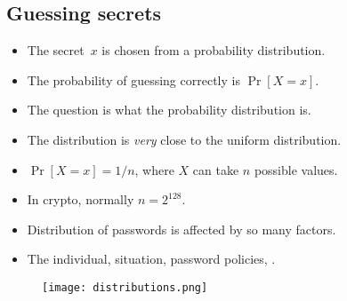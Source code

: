 \subsection{Guessing secrets}

\begin{frame}
  \begin{idea}
    \begin{itemize}
      \item The secret~\(x\) is chosen from a probability distribution.
      \item The probability of guessing correctly is \(\Pr[X = x]\).
    \end{itemize}
  \end{idea}

  \begin{remark}
    \begin{itemize}
      \item The question is what the probability distribution is.
    \end{itemize}
  \end{remark}
\end{frame}

\begin{frame}
  \begin{example}
    \begin{itemize}
      \item The distribution is \emph{very} close to the uniform distribution.
      \item \Ie \(\Pr[X = x] = 1/n\), where \(X\) can take \(n\) possible 
        values.
      \item In crypto, normally \(n = 2^{128}\).
    \end{itemize}
  \end{example}

  \pause

  \begin{example}[Password]
    \begin{itemize}
      \item Distribution of passwords is affected by so many factors.
      \item The individual, situation, password policies, \etc.
    \end{itemize}
  \end{example}
\end{frame}

\begin{frame}
  \begin{figure}
    \texttt{[image: distributions.png]}
  \end{figure}
\end{frame}

